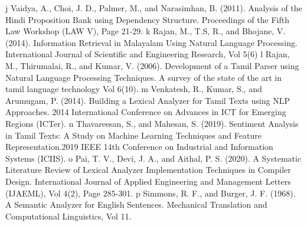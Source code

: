 \documentclass[12pt,a4paper,titlepage]{report}
\begin{document}
\begin{thebibliography}{99}
	\bibitem j Vaidya, A., Choi, J. D., Palmer, M., and Narasimhan, B. (2011). Analysis of the Hindi
	Proposition Bank using Dependency Structure. Proceedings of the Fifth Law Workshop
	(LAW V), Page 21-29.
	\bibitem k Rajan, M., T.S, R., and Bhojane, V. (2014). Information Retrieval in Malayalam Using Natural
	Language Processing. International Journal of Scientific and Engineering Research, Vol 5(6)
	\bibitem l Rajan, M., Thirumalai, R., and Kumar, V. (2006). Development of a Tamil Parser using
	Natural Language Processing Techniques. A survey of the state of the art in tamil language
	technology Vol 6(10).
	\bibitem m Venkatesh, R., Kumar, S., and Arumugam, P. (2014). Building a Lexical Analyzer for Tamil
	Texts using NLP Approaches. 2014 International Conference on Advances in ICT for Emerging
	Regions (ICTer).
	\bibitem n Thavareesan, S., and Mahesan, S. (2019). Sentiment Analysis in Tamil Texts: A Study on
	Machine Learning Techniques and Feature Representation.2019 IEEE 14th Conference on
	Industrial and Information Systems (ICIIS).
	\bibitem o Pai, T. V., Devi, J. A., and Aithal, P. S. (2020). A Systematic Literature Review of Lexical
	Analyzer Implementation Techniques in Compiler Design. International Journal of Applied
	Engineering and Management Letters (IJAEML), Vol 4(2), Page 285-301.
	\bibitem p Simmons, R. F., and Burger, J. F. (1968). A Semantic Analyzer for English Sentences.
	Mechanical Translation and Computational Linguistics, Vol 11.
	
	
	\end{thebibliography}
	
	
%	
	
	
\end{document}
